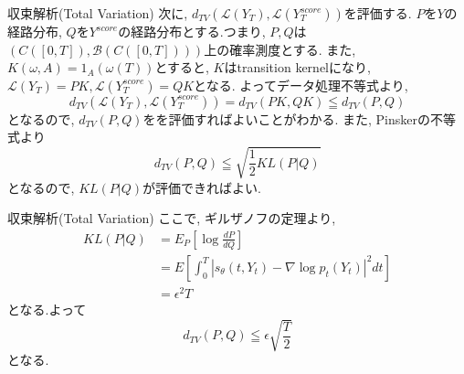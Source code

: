 \documentclass[dvipdfmx,11pt]{beamer}
\theoremstyle{plain}
\theoremstyle{定義}
\begin{document}
  \begin{frame}{収束解析(Total Variation)}
    次に, $d_{TV}(\mathcal{L}(Y_T),\mathcal{L}(Y^{score}_T))$を評価する.
    $P$を$Y$の経路分布, $Q$を$Y^{score}$の経路分布とする.つまり, $P,Q$は$(C([0,T]),\mathcal{B}(C([0,T])))$上の確率測度とする.
    また, $K(\omega,A)=1_A(\omega(T))$とすると, $K$はtransition kernelになり, 
    $\mathcal{L}(Y_T)=PK, \mathcal{L}(Y^{score}_T)=QK$となる.
    よってデータ処理不等式より,
    \begin{equation*}
      d_{TV}(\mathcal{L}(Y_T),\mathcal{L}(Y^{score}_T))=d_{TV}(PK,QK)\leqq d_{TV}(P,Q)
    \end{equation*}
    となるので, $d_{TV}(P,Q)$をを評価すればよいことがわかる.
    また, Pinskerの不等式より
    \begin{equation*}
      d_{TV}(P,Q)\leqq \sqrt{\frac{1}{2}KL(P|Q)}
    \end{equation*}
    となるので, $KL(P|Q)$が評価できればよい.
  \end{frame}

  \begin{frame}{収束解析(Total Variation)}
    ここで, ギルザノフの定理より, 
    \begin{align*}
      KL(P|Q)&=E_P[\log{\frac{dP}{dQ}}]\\
      &=E[\int_{0}^{T}|s_\theta(t,Y_t)-\nabla\log{p_t(Y_t)}|^2dt]\\
      &=\epsilon^2 T
    \end{align*}
    となる.よって
    \begin{equation*}
      d_{TV}(P,Q)\leqq \epsilon\sqrt{\frac{T}{2}}
    \end{equation*}
    となる.
  \end{frame}
\end{document}
